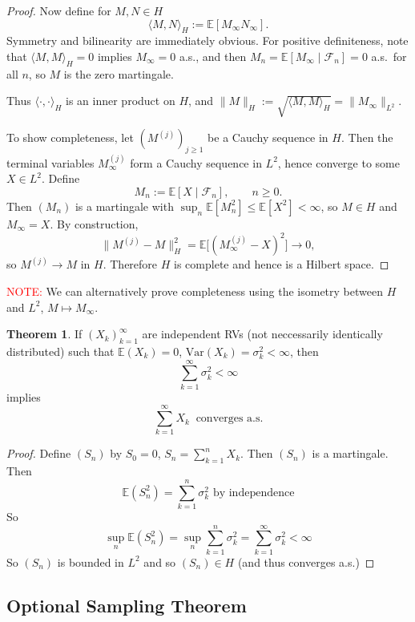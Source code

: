 \documentclass[11pt,a4paper]{article}
\theoremstyle{definition}
\newtheorem{theorem}{Theorem}[section]
\begin{document}
\begin{proof}
Now define for $M,N \in H$
\[
\langle M,N \rangle_H := \mathbb{E}[M_\infty N_\infty].
\]
Symmetry and bilinearity are immediately obvious. For positive definiteness, note that
$\langle M,M\rangle_H = 0$ implies $M_\infty = 0$ a.s., and then
$M_n = \mathbb{E}[M_\infty \mid \mathcal{F}_n] = 0$ a.s.\ for all $n$,
so $M$ is the zero martingale.

Thus $\langle\cdot,\cdot\rangle_H$ is an inner product on $H$, and
$\|M\|_H := \sqrt{\langle M,M\rangle_H} = \|M_\infty\|_{L^2}$.

To show completeness, let $(M^{(j)})_{j\ge1}$ be a Cauchy sequence in $H$.
Then the terminal variables $M^{(j)}_\infty$ form a Cauchy sequence in
$L^2$, hence converge to some $X \in L^2$. Define
\[
M_n := \mathbb{E}[X \mid \mathcal{F}_n], \qquad n\ge0.
\]
Then $(M_n)$ is a martingale with $\sup_n \mathbb{E}[M_n^2]
\le \mathbb{E}[X^2]<\infty$, so $M\in H$ and $M_\infty = X$.
By construction,
\[
\|M^{(j)} - M\|_H^2
   = \mathbb{E}\big[(M^{(j)}_\infty - X)^2\big]
   \longrightarrow 0,
\]
so $M^{(j)} \to M$ in $H$. Therefore $H$ is complete and hence is a
Hilbert space.
\end{proof}

\textcolor{red}{NOTE:} We can alternatively prove completeness using the isometry between $H$ and $L^2$, $M \mapsto M_\infty$.

\begin{theorem}
    If $(X_k)_{k=1}^\infty$ are independent RVs (not neccessarily identically distributed) such that $\mathbb{E}(X_k) = 0$, $\text{Var}(X_k) = \sigma _k^2 < \infty$, then \[
    \sum \limits _{k=1}^{\infty} \sigma _k ^2 < \infty
    \]
    implies \[
    \sum \limits _{k=1}^{\infty} X_k \ \text{ converges a.s.}
    \]
\end{theorem}

\begin{proof}
    Define $(S_n)$ by $S_0 = 0$, $S_n = \sum \limits _{k=1}^n X_k$. Then $(S_n)$ is a martingale. Then \[
    \mathbb{E}(S_n^2) = \sum \limits _{k=1}^n \sigma _k^2 \text{ by independence}
    \]
    So \[\sup \limits _{n} \mathbb{E} (S_n^2) = \sup \limits _n \sum \limits _{k=1}^n \sigma _k^2 = \sum \limits _{k=1}^\infty \sigma _k^2 < \infty\]
    So $(S_n)$ is bounded in $L^2$ and so $(S_n) \in H$ (and thus converges a.s.)
\end{proof}

\subsection{Optional Sampling Theorem}
\end{document}
